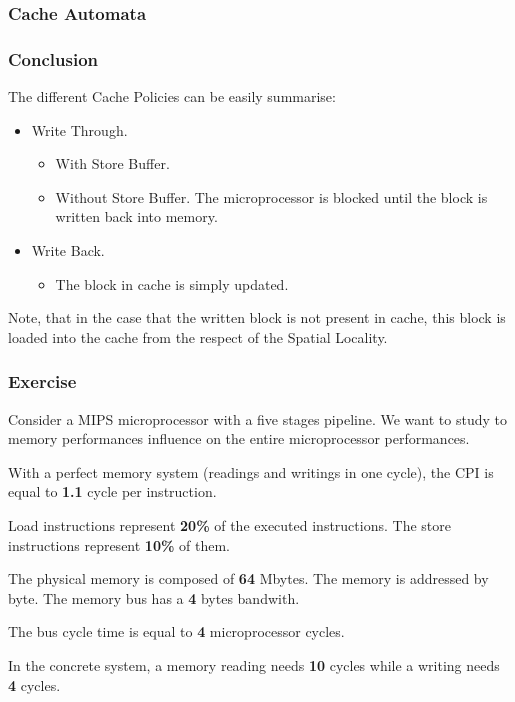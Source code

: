 
\begin{frame}
  \frametitle{Cache Automata}

  \begin{center}
  \end{center}
\end{frame}


\begin{frame}
  \frametitle{Conclusion}

  The different Cache Policies can be easily summarise:

  \begin{itemize}[<+->]
    \item
      Write Through.

      \begin{itemize}
	\item
	  With Store Buffer.
	\item
	  Without Store Buffer. The microprocessor is blocked until the
	  block is written back into memory.
      \end{itemize}

    \item
      Write Back.

      \begin{itemize}
	\item
	  The block in cache is simply updated.
      \end{itemize}
  \end{itemize}

  Note, that in the case that the written block is not present in cache,
  this block is loaded into the cache from the respect of the Spatial
  Locality.
\end{frame}


\begin{frame}
  \frametitle{Exercise}

  Consider a MIPS microprocessor with a five stages pipeline. We want to
  study to memory performances influence on the entire microprocessor
  performances.

  \-

  With a perfect memory system (readings and writings in one cycle),
  the CPI is equal to \textbf{1.1} cycle per instruction.

  \-

  Load instructions represent \textbf{20\%} of the executed instructions.
  The store instructions represent \textbf{10\%} of them.

  \-

  The physical memory is composed of \textbf{64} Mbytes. The memory
  is addressed by byte. The memory bus has a \textbf{4} bytes bandwith.

  \-

  The bus cycle time is equal to \textbf{4} microprocessor cycles.

  \-

  In the concrete system, a memory reading needs \textbf{10} cycles while
  a writing needs \textbf{4} cycles.
\end{frame}

